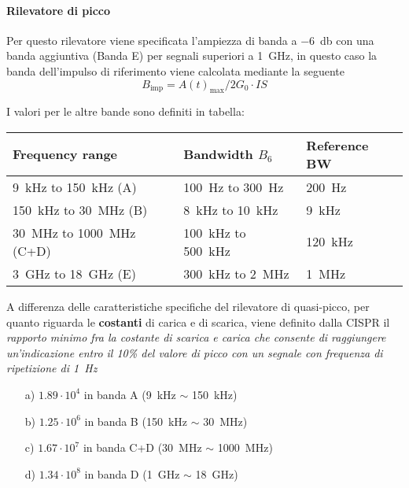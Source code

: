 \paragraph{Rilevatore di picco}
Per questo rilevatore viene specificata l'ampiezza di banda a \SI{-6}{\decibel} con
una banda aggiuntiva (Banda E) per segnali superiori a \SI{1}{\giga\hertz}, in questo
caso la banda dell'impulso di riferimento viene calcolata mediante la seguente
$$ %
 B_{\text{imp}} = A(t)_{\text{max}} / 2G_0 \cdot IS
$$

I valori per le altre bande sono definiti in tabella:

\begin{center} %
 \begin{tabular}{|>{\centering}m{5cm}|>{\centering}m{3.2cm}|m{3.2cm}<{\centering}|}
  \hline
    \textbf{Frequency range} & \textbf{Bandwidth $B_6$} & \textbf{Reference BW}  \\ \hline
    \SI{9}{\kilo\hertz}   to \SI{150}{\kilo\hertz}  (A)   & \SI{100}{\hertz}      to \SI{300}{\hertz}      & \SI{200}{\hertz}      \\ \hline
    \SI{150}{\kilo\hertz} to \SI{30}{\mega\hertz}   (B)   & \SI{8}{\kilo\hertz}   to \SI{10}{\kilo\hertz}  & \SI{9}{\kilo\hertz}   \\ \hline
    \SI{30}{\mega\hertz}  to \SI{1000}{\mega\hertz} (C+D) & \SI{100}{\kilo\hertz} to \SI{500}{\kilo\hertz} & \SI{120}{\kilo\hertz} \\ \hline
    \SI{3}{\giga\hertz}   to \SI{18}{\giga\hertz}   (E)   & \SI{300}{\kilo\hertz} to \SI{2}{\mega\hertz}   & \SI{1}{\mega\hertz}   \\ \hline
 \end{tabular}
\end{center}

A differenza delle caratteristiche specifiche del rilevatore di quasi-picco,
per quanto riguarda le \textbf{costanti} di carica e di scarica, viene
definito dalla CISPR il \textit{rapporto minimo fra la costante di scarica e carica
che consente di raggiungere un'indicazione entro il 10\% del valore di picco con un segnale
con frequenza di ripetizione di \SI{1}{\hertz}}
\begin{itemize} %
 \item [a)] $1.89\cdot10^4$ in banda A   (\SI{9}{\kilo\hertz}   $\sim$ \SI{150}{\kilo\hertz})
 \item [b)] $1.25\cdot10^6$ in banda B   (\SI{150}{\kilo\hertz} $\sim$ \SI{30}{\mega\hertz})
 \item [c)] $1.67\cdot10^7$ in banda C+D (\SI{30}{\mega\hertz}  $\sim$ \SI{1000}{\mega\hertz})
 \item [d)] $1.34\cdot10^8$ in banda D   (\SI{1}{\giga\hertz}   $\sim$ \SI{18}{\giga\hertz})
\end{itemize}


